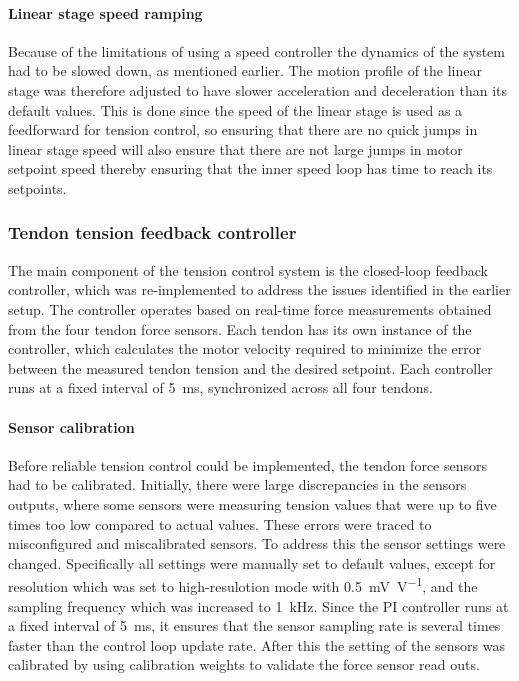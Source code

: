 \paragraph*{Linear stage speed ramping}
Because of the limitations of using a speed controller the dynamics of the system had to be slowed down, as mentioned earlier. The motion profile of the linear stage was therefore adjusted to have slower acceleration and deceleration than its default values. This is done since the speed of the linear stage is used as a feedforward for tension control, so ensuring that there are no quick jumps in linear stage speed will also ensure that there are not large jumps in motor setpoint speed thereby ensuring that the inner speed loop has time to reach its setpoints.

\subsubsection{Tendon tension feedback controller}
The main component of the tension control system is the closed-loop feedback controller, which was re-implemented to address the issues identified in the earlier setup. The controller operates based on real-time force measurements obtained from the four tendon force sensors. Each tendon has its own instance of the controller, which calculates the motor velocity required to minimize the error between the measured tendon tension and the desired setpoint. Each controller runs at a fixed interval of \SI{5}{\milli \second}, synchronized across all four tendons. 

\paragraph*{Sensor calibration}
Before reliable tension control could be implemented, the tendon force sensors had to be calibrated. Initially, there were large discrepancies in the sensors outputs, where some sensors were measuring tension values that were up to five times too low compared to actual values. These errors were traced to misconfigured and miscalibrated sensors. To address this the sensor settings were changed. Specifically all settings were manually set to default values, except for resolution which was set to high-resulotion mode with  \SI{0.5}{\milli\volt\per\volt}, and the sampling frequency which was increased to \SI{1}{\kilo\hertz}. Since the PI controller runs at a fixed interval of \SI{5}{\milli\second}, it ensures that the sensor sampling rate is several times faster than the control loop update rate. After this the setting of the sensors was calibrated by using calibration weights to validate the force sensor read outs.

